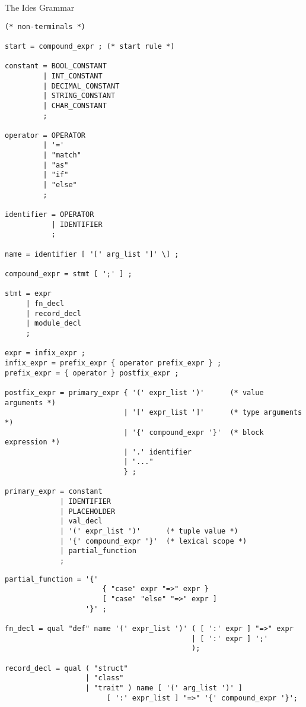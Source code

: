 \documentclass[journal]{IEEEtran}
\makeatletter
\def\section{\@startsection {section}{1}{\z@}{24pt plus 2pt minus 2pt}
{12pt plus 2pt minus 2pt}{\large\bf}}
\makeatother
\begin{document}
\begin{appendices}
\section{The Ides Grammar} \label{app:grammar}
{ %
\begin{verbatim}
(* non-terminals *)

start = compound_expr ; (* start rule *)

constant = BOOL_CONSTANT 
         | INT_CONSTANT 
         | DECIMAL_CONSTANT 
         | STRING_CONSTANT
         | CHAR_CONSTANT
         ;

operator = OPERATOR
         | '='
         | "match"
         | "as"
         | "if"
         | "else"
         ;

identifier = OPERATOR
           | IDENTIFIER
           ;

name = identifier [ '[' arg_list ']' \] ;

compound_expr = stmt [ ';' ] ;

stmt = expr
     | fn_decl
     | record_decl
     | module_decl
     ;

expr = infix_expr ;
infix_expr = prefix_expr { operator prefix_expr } ;
prefix_expr = { operator } postfix_expr ;

postfix_expr = primary_expr { '(' expr_list ')'      (* value arguments *)
                            | '[' expr_list ']'      (* type arguments *)
                            | '{' compound_expr '}'  (* block expression *)
                            | '.' identifier
                            | "..."
                            } ;

primary_expr = constant
             | IDENTIFIER
             | PLACEHOLDER
             | val_decl
             | '(' expr_list ')'      (* tuple value *)
             | '{' compound_expr '}'  (* lexical scope *)
             | partial_function
             ;

\end{verbatim}
\newpage
\begin{verbatim}
partial_function = '{' 
                       { "case" expr "=>" expr } 
                       [ "case" "else" "=>" expr ]
                   '}' ;

fn_decl = qual "def" name '(' expr_list ')' ( [ ':' expr ] "=>" expr
                                            | [ ':' expr ] ';'
                                            );

record_decl = qual ( "struct" 
                   | "class" 
                   | "trait" ) name [ '(' arg_list ')' ] 
                        [ ':' expr_list ] "=>" '{' compound_expr '}';


\end{verbatim}}
\end{appendices}
\end{document}

